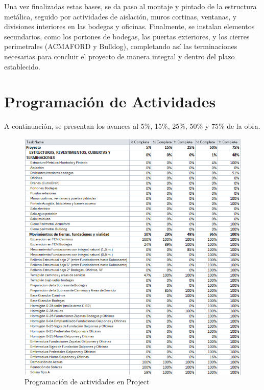 \documentclass{article} %
\begin{document}
Una vez finalizadas estas bases, se da paso al montaje y pintado de la estructura metálica, seguido por actividades de aislación, muros cortinas, ventanas, y divisiones interiores en las bodegas y oficinas. Finalmente, se instalan elementos secundarios, como los portones de bodegas, las puertas exteriores, y los cierres perimetrales (ACMAFORD y Bulldog), completando así las terminaciones necesarias para concluir el proyecto de manera integral y dentro del plazo establecido.

\newpage

\section{Programación de Actividades}

A continuación, se presentan los avances al 5\%, 15\%, 25\%, 50\% y 75\% de la obra.

\begin{figure}[H]
    \centering
    \includegraphics[width=1\linewidth]{GRAFICOS/P1A.png}
    \caption{Programación de actividades en Project}
    \label{fig:programacion}
\end{figure}
\end{document}
